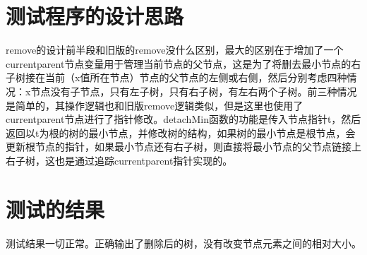 \documentclass[UTF8]{ctexart}
\begin{document}
\pagestyle{fancy}
\fancyhead{}

\section{测试程序的设计思路}

remove的设计前半段和旧版的remove没什么区别，最大的区别在于增加了一个currentparent节点变量用于管理当前节点的父节点，这是为了将删去最小节点的右子树接在当前（x值所在节点）节点的父节点的左侧或右侧，然后分别考虑四种情况：x节点没有子节点，只有左子树，只有右子树，有左右两个子树。前三种情况是简单的，其操作逻辑也和旧版remove逻辑类似，但是这里也使用了currentparent节点进行了指针修改。detachMin函数的功能是传入节点指针t，然后返回以t为根的树的最小节点，并修改树的结构，如果树的最小节点是根节点，会更新根节点的指针，如果最小节点还有右子树，则直接将最小节点的父节点链接上右子树，这也是通过追踪currentparent指针实现的。

\section{测试的结果}

测试结果一切正常。正确输出了删除后的树，没有改变节点元素之间的相对大小。
\end{document}
